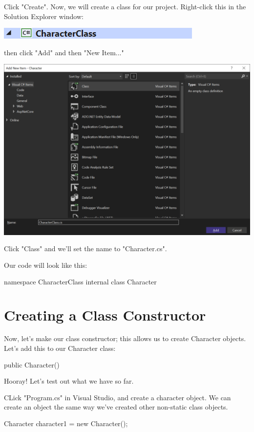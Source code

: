 \documentclass[oneside, openany] {book}
\begin{document}
Click "Create". Now, we will create a class for our project. Right-click this in the Solution Explorer window:

\includegraphics{Character}

then click "Add" and then "New Item..."

\includegraphics[scale=0.6]{CharacterClassCreator}

Click "Class" and we'll set the name to "Character.cs".

Our code will look like this:
\begin{CSharp}
namespace CharacterClass
{
    internal class Character
    {
    }
}
\end{CSharp}

\section{Creating a Class Constructor}
Now, let's make our class constructor; this allows us to create Character objects. Let's add this to our Character class:

\begin{CSharp}
public Character()
{}
\end{CSharp}
Hooray! Let's test out what we have so far. 

CLick "Program.cs" in Visual Studio, and create a character object. We can create an object the same way we've created other non-static class objects.

\begin{CSharp}
Character character1 = new Character();
\end{CSharp}
\end{document}
